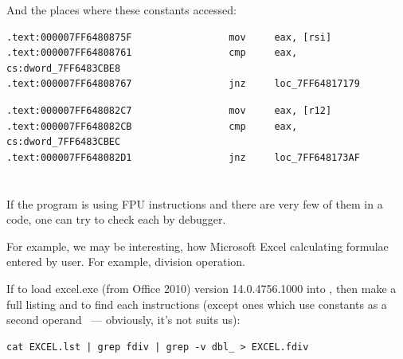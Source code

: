 {And the places where these constants accessed:}

\begin{lstlisting}[caption=dhcpcore.dll (Windows 7 x64)]
.text:000007FF6480875F                 mov     eax, [rsi]
.text:000007FF64808761                 cmp     eax, cs:dword_7FF6483CBE8
.text:000007FF64808767                 jnz     loc_7FF64817179
\end{lstlisting}


\begin{lstlisting}[caption=dhcpcore.dll (Windows 7 x64)]
.text:000007FF648082C7                 mov     eax, [r12]
.text:000007FF648082CB                 cmp     eax, cs:dword_7FF6483CBEC
.text:000007FF648082D1                 jnz     loc_7FF648173AF
\end{lstlisting}

\section{}

{If the program is using FPU instructions and there are very few of them in a code,
one can try to check each by debugger.}

{For example, we may be interesting, how Microsoft Excel calculating formulae entered by user.
For example, division operation.}

\index{\GrepUsage}
{If to load excel.exe (from Office 2010) version 14.0.4756.1000 into \IDA, then make a full listing
and to find each \FDIV instructions (except ones which use constants as a second 
operand ~--- obviously, it's not suits us):}

\begin{lstlisting}
cat EXCEL.lst | grep fdiv | grep -v dbl_ > EXCEL.fdiv
\end{lstlisting}

